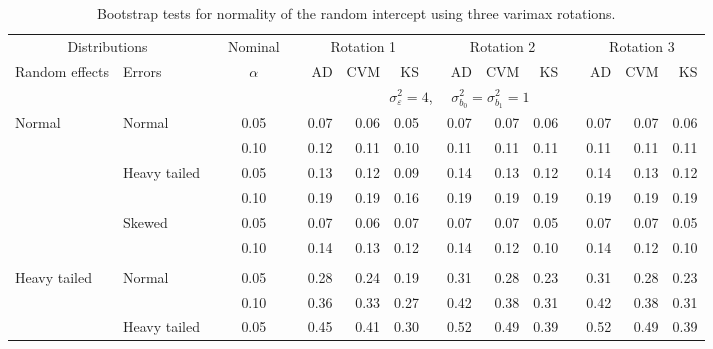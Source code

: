 \documentclass[12pt]{article} %
\begin{document}
\begin{table}[ht]
\begin{scriptsize}
\begin{center}
\begin{tabular}{ll p{.1cm} c p{.1cm} rrr p{.1cm} rrr p{.1cm} rrr}
   \hline
\end{tabular}
\end{center}
\end{scriptsize}
\end{table}

\begin{table}[ht]
\caption{Bootstrap tests for normality of the random intercept using three varimax rotations.}
\begin{scriptsize}
\begin{center}
\begin{tabular}{ll p{.1cm} c p{.1cm} rrr p{.1cm} rrr p{.1cm} rrr}
  \hline
  \multicolumn{2}{c}{Distributions}& & Nominal & &  \multicolumn{3}{c}{Rotation 1} & & \multicolumn{3}{c}{Rotation 2} & & \multicolumn{3}{c}{Rotation 3}\\ \cline{1-2} \cline{6-8} \cline{10-12} \cline{14-16}
  Random effects & Errors & & $\alpha$ & & AD & CVM & KS & & AD & CVM & KS & & AD & CVM & KS \\ 
   \hline
& && && \multicolumn{9}{c}{$\sigma_{\varepsilon}^2 = 4$, \ \ $\sigma_{b_0}^2 = \sigma_{b_1}^2 = 1$} \\ \cline{6-16}
\rowcolor{gray!20}Normal       & Normal       && 0.05 &&   0.07 & 0.06 & 0.05 && 0.07 & 0.07 & 0.06 && 0.07 & 0.07 & 0.06 \\ 
\rowcolor{gray!20}             &              && 0.10 &&   0.12 & 0.11 & 0.10 && 0.11 & 0.11 & 0.11 && 0.11 & 0.11 & 0.11 \\ 
\rowcolor{gray!20}             & Heavy tailed && 0.05 &&   0.13 & 0.12 & 0.09 && 0.14 & 0.13 & 0.12 && 0.14 & 0.13 & 0.12 \\ 
\rowcolor{gray!20}             &              && 0.10 &&   0.19 & 0.19 & 0.16 && 0.19 & 0.19 & 0.19 && 0.19 & 0.19 & 0.19 \\ 
\rowcolor{gray!20}             & Skewed       && 0.05 &&   0.07 & 0.06 & 0.07 && 0.07 & 0.07 & 0.05 && 0.07 & 0.07 & 0.05 \\ 
\rowcolor{gray!20}             &              && 0.10 &&   0.14 & 0.13 & 0.12 && 0.14 & 0.12 & 0.10 && 0.14 & 0.12 & 0.10 \\ 
             &&&&&&&&&&&&&&&\\
Heavy tailed & Normal       && 0.05 &&   0.28 & 0.24 & 0.19 && 0.31 & 0.28 & 0.23 && 0.31 & 0.28 & 0.23 \\ 
             &              && 0.10 &&   0.36 & 0.33 & 0.27 && 0.42 & 0.38 & 0.31 && 0.42 & 0.38 & 0.31 \\ 
             & Heavy tailed && 0.05 &&   0.45 & 0.41 & 0.30 && 0.52 & 0.49 & 0.39 && 0.52 & 0.49 & 0.39 \\ 

\end{tabular}
\end{center}
\end{scriptsize}
\end{table}
\end{document}
